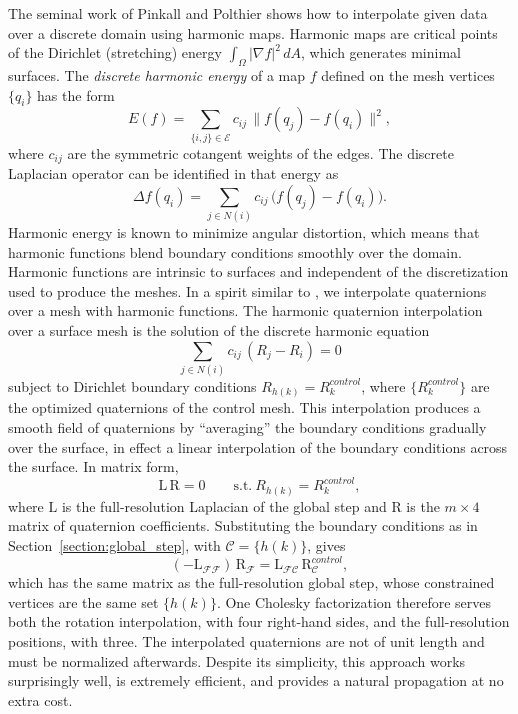 \documentclass{birkjour}
\theoremstyle{remark}
\numberwithin{equation}{section}
\begin{document}
The seminal work of Pinkall and Polthier \cite{Pinkall1993} shows how to interpolate given data over a discrete domain using harmonic maps. Harmonic maps are critical points of the Dirichlet (stretching) energy $\int_{\Omega} |\nabla f|^2 \, dA$, which generates minimal surfaces.
The \emph{discrete harmonic energy} of a map $f$ defined on the mesh vertices $\{q_i\}$ has the form
\begin{equation}
E(f) = \sum_{\{i,j\} \in \mathcal E} c_{ij} \, \| f(q_j) - f(q_i) \|^2 ,
\end{equation}
where $c_{ij}$ are the symmetric cotangent weights \cite{Pinkall1993} of the edges. The discrete Laplacian operator can be identified in that energy as
\begin{equation}
\Delta f(q_i) = \sum_{j \in N(i)} c_{ij} \, \big( f(q_j) - f(q_i) \big).
\end{equation}
Harmonic energy is known to minimize angular distortion, which means that harmonic functions blend boundary conditions smoothly over the domain. Harmonic functions are intrinsic to surfaces and independent of the discretization used to produce the meshes. In a spirit similar to \cite{Zayer2005}, we interpolate quaternions over a mesh with harmonic functions. The harmonic quaternion interpolation over a surface mesh is the solution of the discrete harmonic equation
\begin{equation}
\label{eq:harmonic_rotor}
   \sum_{j \in N(i)} c_{ij} \, ( R_j - R_i ) = 0
\end{equation}
subject to Dirichlet boundary conditions $R_{h(k)} = R^{control}_k$, where $\{R^{control}_k\}$ are the optimized quaternions of the control mesh. This interpolation produces a smooth field of quaternions by ``averaging'' the boundary conditions gradually over the surface, in effect a linear interpolation of the boundary conditions across the surface. In matrix form,
\begin{equation*}
\mathrm L \, \mathrm R = 0 \qquad \text{s.t.} \ R_{h(k)} = R^{control}_k ,
\end{equation*}
where $\mathrm L$ is the full-resolution Laplacian of the global step and $\mathrm R$ is the $m \times 4$ matrix of quaternion coefficients. Substituting the boundary conditions as in Section~\ref{section:global_step}, with $\mathcal C = \{h(k)\}$, gives
\begin{equation}
\label{eq:harmonic_reduced}
(-\mathrm L_{\mathcal F \mathcal F}) \, \mathrm R_{\mathcal F} = \mathrm L_{\mathcal F \mathcal C} \, \mathrm R^{control}_{\mathcal C},
\end{equation}
which has the same matrix as the full-resolution global step, whose constrained vertices are the same set $\{h(k)\}$. One Cholesky factorization therefore serves both the rotation interpolation, with four right-hand sides, and the full-resolution positions, with three. The interpolated quaternions are not of unit length and must be normalized afterwards. Despite its simplicity, this approach works surprisingly well, is extremely efficient, and provides a natural propagation at no extra cost.
\end{document}
